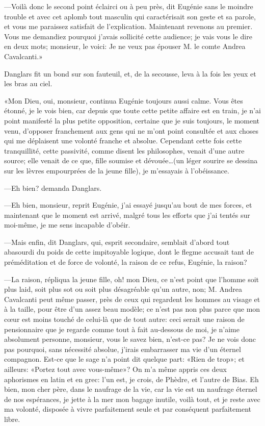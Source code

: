 —Voilà donc le second point éclairci ou à peu près, dit Eugénie sans le moindre trouble et avec cet aplomb tout masculin qui caractérisait son geste et sa parole, et vous me paraissez satisfait de l'explication. Maintenant revenons au premier. Vous me demandiez pourquoi j'avais sollicité cette audience; je vais vous le dire en deux mots; monsieur, le voici: Je ne veux pas épouser M. le comte Andrea Cavalcanti.» 

Danglars fit un bond sur son fauteuil, et, de la secousse, leva à la fois les yeux et les bras au ciel. 

«Mon Dieu, oui, monsieur, continua Eugénie toujours aussi calme. Vous êtes étonné, je le vois bien, car depuis que toute cette petite affaire est en train, je n'ai point manifesté la plus petite opposition, certaine que je suis toujours, le moment venu, d'opposer franchement aux gens qui ne m'ont point consultée et aux choses qui me déplaisent une volonté franche et absolue. Cependant cette fois cette tranquillité, cette passivité, comme disent les philosophes, venait d'une autre source; elle venait de ce que, fille soumise et dévouée\dots (un léger sourire se dessina sur les lèvres empourprées de la jeune fille), je m'essayais à l'obéissance. 

—Eh bien? demanda Danglars. 

—Eh bien, monsieur, reprit Eugénie, j'ai essayé jusqu'au bout de mes forces, et maintenant que le moment est arrivé, malgré tous les efforts que j'ai tentés sur moi-même, je me sens incapable d'obéir. 

—Mais enfin, dit Danglars, qui, esprit secondaire, semblait d'abord tout abasourdi du poids de cette impitoyable logique, dont le flegme accusait tant de préméditation et de force de volonté, la raison de ce refus, Eugénie, la raison? 

—La raison, répliqua la jeune fille, oh! mon Dieu, ce n'est point que l'homme soit plus laid, soit plus sot ou soit plus désagréable qu'un autre, non; M. Andrea Cavalcanti peut même passer, près de ceux qui regardent les hommes au visage et à la taille, pour être d'un assez beau modèle; ce n'est pas non plus parce que mon cœur est moins touché de celui-là que de tout autre: ceci serait une raison de pensionnaire que je regarde comme tout à fait au-dessous de moi, je n'aime absolument personne, monsieur, vous le savez bien, n'est-ce pas? Je ne vois donc pas pourquoi, sans nécessité absolue, j'irais embarrasser ma vie d'un éternel compagnon. Est-ce que le sage n'a point dit quelque part: «Rien de trop»; et ailleurs: «Portez tout avec vous-même»? On m'a même appris ces deux aphorismes en latin et en grec: l'un est, je crois, de Phèdre, et l'autre de Bias. Eh bien, mon cher père, dans le naufrage de la vie, car la vie est un naufrage éternel de nos espérances, je jette à la mer mon bagage inutile, voilà tout, et je reste avec ma volonté, disposée à vivre parfaitement seule et par conséquent parfaitement libre. 


